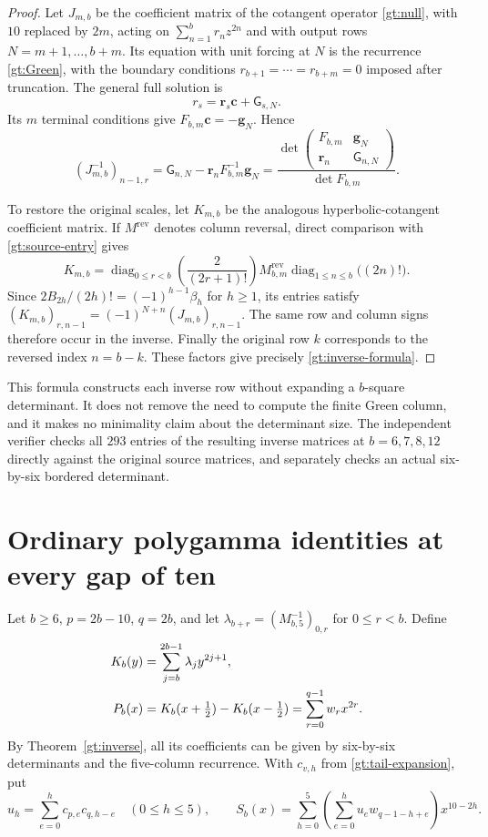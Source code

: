 \documentclass[11pt,a4paper]{article}
\theoremstyle{definition}
\theoremstyle{remark}
\numberwithin{equation}{section}
\begin{document}
\begin{proof}
Let $J_{m,b}$ be the coefficient matrix of the cotangent operator
\eqref{gt:null}, with $10$ replaced by $2m$, acting on
$\sum_{n=1}^b r_nz^{2n}$ and with output rows
$N=m+1,\ldots,b+m$. Its equation with unit forcing at $N$ is
the recurrence \eqref{gt:Green}, with the boundary conditions
$r_{b+1}=\cdots=r_{b+m}=0$ imposed after truncation.
The general full solution is
\[
          r_s=\mathbf r_s\mathbf c+\mathsf G_{s,N}.
\]
Its $m$ terminal conditions give
$F_{b,m}\mathbf c=-\mathbf g_N$. Hence
\[
 (J_{m,b}^{-1})_{n-1,r}
 =\mathsf G_{n,N}-\mathbf r_nF_{b,m}^{-1}\mathbf g_N
 =\frac{\det\begin{pmatrix}F_{b,m}&\mathbf g_N\\
                  \mathbf r_n&\mathsf G_{n,N}\end{pmatrix}}
        {\det F_{b,m}}.
\]

To restore the original scales, let $K_{m,b}$ be the analogous
hyperbolic-cotangent coefficient matrix. If $M^{\mathrm{rev}}$
denotes column reversal, direct comparison with
\eqref{gt:source-entry} gives
\[
 K_{m,b}=\operatorname{diag}_{0\le r<b}
           \left(\frac2{(2r+1)!}\right)
         M_{b,m}^{\mathrm{rev}}
         \operatorname{diag}_{1\le n\le b}\bigl((2n)!\bigr).
\]
Since $2B_{2h}/(2h)!=(-1)^{h-1}\beta_h$ for $h\ge1$,
its entries satisfy
$(K_{m,b})_{r,n-1}=(-1)^{N+n}(J_{m,b})_{r,n-1}$.
The same row and column signs therefore occur in the inverse.
Finally the original row $k$ corresponds to the reversed index
$n=b-k$. These factors give precisely \eqref{gt:inverse-formula}.
\end{proof}

This formula constructs each inverse row without expanding a
$b$-square determinant. It does not remove the need to compute the
finite Green column, and it makes no minimality claim about the
determinant size. The independent verifier checks all $293$ entries
of the resulting inverse matrices at $b=6,7,8,12$ directly against
the original source matrices, and separately checks an actual
six-by-six bordered determinant.

\section{Ordinary polygamma identities at every gap of ten}
\label{gt:identities}

Let $b\ge6$, $p=2b-10$, $q=2b$, and let
$\lambda_{b+r}=(M_{b,5}^{-1})_{0,r}$ for $0\le r<b$.
Define
\begin{align}
 K_b(y)&=\sum_{j=b}^{2b-1}\lambda_jy^{2j+1},\notag\\
 P_b(x)&=K_b(x+\tfrac12)-K_b(x-\tfrac12)
                   =\sum_{r=0}^{q-1}w_rx^{2r}.\label{gt:P}
\end{align}
By Theorem~\ref{gt:inverse}, all its coefficients can be given by
six-by-six determinants and the five-column recurrence.
With $c_{v,h}$ from \eqref{gt:tail-expansion}, put
\[
 u_h=\sum_{e=0}^{h}c_{p,e}c_{q,h-e}\quad(0\le h\le5),
 \qquad
 S_b(x)=\sum_{h=0}^{5}
       \left(\sum_{e=0}^{h}u_e w_{q-1-h+e}\right)x^{10-2h}.
\]
\end{document}

